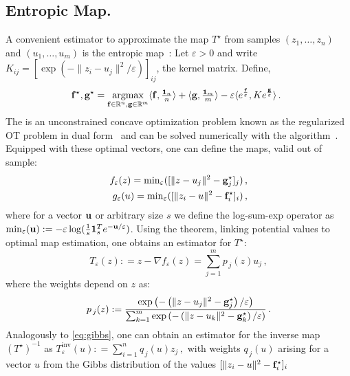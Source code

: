 \subsection{Entropic Map.}
A convenient estimator to approximate the \citeauthor{Bre91} map $T^\star$ from samples $(z_1,\dots, z_n)$ and $(u_1, \dots, u_m)$ is the entropic map~\citep{pooladian2021entropic}: Let $\varepsilon>0$ and write $K_{ij} = [\exp(-\|z_i-u_j\|^2/\varepsilon)]_{ij}$, the kernel matrix. Define,
\begin{equation}\label{eq:finitedual}
\!\!\!\mathbf{f}^\star, \mathbf{g}^\star = \operatorname*{argmax}_{\mathbf{f}\in\mathbb{R}^n,\mathbf{g}\in\mathbb{R}^m} \langle\mathbf{f}, \tfrac{\mathbf{1}_n}{n}\rangle + \langle\mathbf{g}, \tfrac{\mathbf{1}_m}{m}\rangle  - \varepsilon \langle e^{\frac{\mathbf{f}}{\varepsilon}}, K e^{\frac{\mathbf{g}}{\varepsilon}}\rangle\,.
\end{equation}
The  is an unconstrained concave optimization problem known as the regularized OT problem in dual form~\citep[Prop.~4.4]{PeyCut19} and can be solved numerically with the \citeauthor{Sinkhorn64} algorithm~\citep{cuturi2013sinkhorn}. Equipped with these optimal vectors, one can define the maps, valid out of sample:
\begin{align}\label{eq:fdual}
f_\varepsilon(z)= \operatorname{min}_\varepsilon([\|z-u_j\|^2 - \mathbf{g}^\star_j]_j)\,,\\
\label{eq:gdual}
g_\varepsilon(u)= \operatorname{min}_\varepsilon([\|z_i-u\|^2 - \mathbf{f}^\star_i]_i)\,,
\end{align}
where for a vector $\mathbf{u}$ or arbitrary size $s$ we define the log-sum-exp operator as $\operatorname{min}_\varepsilon(\mathbf{u}):= - \varepsilon \log (\tfrac{1}{s}\mathbf{1}_s^Te^{-\mathbf{u}/\varepsilon})$. Using the \citet{Bre91} theorem, linking potential values to optimal map estimation, one obtains an estimator for $T^\star$:
\begin{equation}\label{eq:empirical_entropic_map}
T_{\varepsilon}(z) : = z - \nabla f_\varepsilon(z) = \sum_{j=1}^m p_{\,j}(z)u_j\,,
\end{equation}
where the weights depend on $z$ as:
\begin{equation}\label{eq:gibbs}
p_{\,j}(z):=\frac{\exp\left(- \left(\|z-u_j\|^2-\mathbf{g}_j^\star\right)/\varepsilon\right)}{\sum_{k=1}^m \exp\left(- \left(\|z-u_k\|^2-\mathbf{g}_k^\star\right)/\varepsilon\right)}\,.
\end{equation} 
Analogously to \eqref{eq:gibbs}, one can obtain an estimator for the inverse map $(T^\star)^{-1}$ as $T^{\text{inv}}_{\varepsilon}(u) : = \sum_{i=1}^n q_{\,j}(u)z_j\,,$ with weights $q_{\,j}(u)$ arising for a vector $u$ from the Gibbs distribution of the values $[\|z_i-u\|^2 - \mathbf{f}^\star_i]_i$

